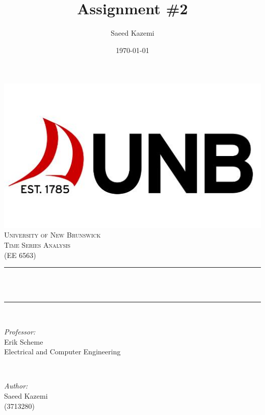 \documentclass[12pt]{article}
\title{Assignment \#2}				%
\author{Saeed Kazemi}				%
\date{\today}						%
\makeatletter
\let\thedate\@date
\let\thetitle\@title
\makeatother
\begin{document}


\begin{titlepage}
	\centering
    \vspace*{0.4 cm}
    \includegraphics[scale = 0.5]{figures/unb.jpg}\\[1.0 cm]	%
    \textsc{\LARGE \newline\newline University of New Brunswick}\\[1.8 cm]	%
	\textsc{\Large Time Series Analysis\\(EE 6563)}\\[0.5 cm]				%
	\rule{\linewidth}{0.2 mm} \\[0.4 cm]
	{ \huge \bfseries \thetitle}\\
	\rule{\linewidth}{0.2 mm} \\[1.5 cm]
	
	\begin{minipage}{0.5\textwidth}
		\begin{flushleft} \large
			\emph{Professor:}\\
			Erik Scheme\\
            Electrical and Computer Engineering\\
			\end{flushleft}
			\end{minipage}~
			\begin{minipage}{0.5\textwidth}
            
			\begin{flushright} \large
			\emph{Author:} \\
			Saeed Kazemi\\ (3713280)\\

		\end{flushright}
        
	\end{minipage}\\[1 cm]
	
	
    \thedate
    
    
    
	
\end{titlepage}
\end{document}
